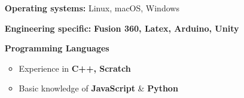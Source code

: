 \documentclass{article}
\begin{document}
\begin{minipage}[t]{0.7\textwidth}
    \begin{itemize}        
           
    	\item [\textbf{Operating systems:}]Linux, macOS, Windows
    	       
    	\item [\textbf{Engineering specific:}] \textbf{Fusion 360, Latex, Arduino, Unity} 
        
    	\item [\textbf{Programming Languages}]
            \begin{itemize}        

    	        \item Experience in \textbf{C++, Scratch}
    	        \item Basic knowledge of \textbf{JavaScript} \& \textbf{Python}
            \end{itemize}
    \end{itemize}

\end{minipage}%
\end{document}
